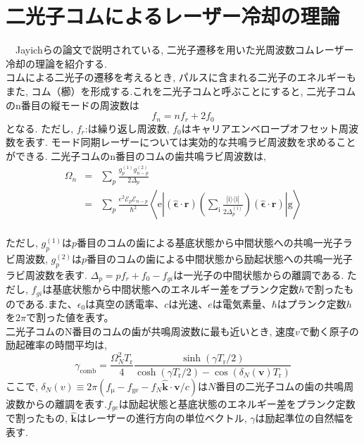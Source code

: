 \documentclass[uplatex, dvipdfmx, a4paper, report, papersize, 11pt]{jsbook}
\begin{document}
\section{二光子コムによるレーザー冷却の理論}
　Jayichらの論文\cite{PhysRevX.6.041004}で説明されている, 二光子遷移を用いた光周波数コムレーザー冷却の理論を紹介する.\\
コムによる二光子の遷移を考えるとき, パルスに含まれる二光子のエネルギーもまた, コム（櫛）を形成する.これを二光子コムと呼ぶことにすると, 二光子コムのn番目の縦モードの周波数は
\begin{equation}
f_n = nf_r + 2f_0
\end{equation}
となる. ただし, $f_r$:は繰り返し周波数, $f_0$はキャリアエンベロープオフセット周波数を表す. モード同期レーザーについては実効的な共鳴ラビ周波数を求めることができる. 二光子コムのn番目のコムの歯共鳴ラビ周波数は,
\begin{eqnarray}\label{ResonanceRabi}
\Omega _{n} &=&\sum _{p}\frac {g^{\left( 1\right) }_{p}g^{\left( 2\right) }_{n-p}}{2\Delta_p} \nonumber\\
&=& \sum _ { p } \frac { e ^ { 2 } \mathcal { E } _ { p } \mathcal { E } _ { n - p } } { \hbar ^ { 2 } } \left\langle \mathrm { e } \left| ( \hat { \boldsymbol { \epsilon } } \cdot \mathbf { r } ) \left( \sum _ { \mathrm { i } } \frac { | \mathrm { i } \rangle \langle \mathrm { i } | } { 2 \Delta _ { p } ^ { ( \mathrm { i } ) } } \right) ( \hat { \boldsymbol { \epsilon } } \cdot \mathbf { r } ) \right| \mathrm { g } \right\rangle
\end{eqnarray}\\
ただし, $g^{\left( 1\right) }_{p}$は$p$番目のコムの歯による基底状態から中間状態への共鳴一光子ラビ周波数, $g^{\left( 2\right) }_{p}$は$p$番目のコムの歯による中間状態から励起状態への共鳴一光子ラビ周波数を表す.
$\Delta _{p}=pf_{r}+f_{0}-f_{gi}$は一光子の中間状態からの離調である. ただし, $f_{gi}$は基底状態から中間状態へのエネルギー差をプランク定数$h$で割ったものである.また、$\epsilon_0$は真空の誘電率、$c$は光速、$e$は電気素量、$\hbar$はプランク定数$h$を$2\pi$で割った値を表す。\\
二光子コムのN番目のコムの歯が共鳴周波数に最も近いとき, 速度$v$で動く原子の励起確率の時間平均は,
\begin{equation}\label{ExcitationRate}
\gamma_\mathrm{comb} = \frac{\Omega^2_{N}T_\mathrm{r}} {4} \frac{\sinh(\gamma T_\mathrm{r}/2)}{\cosh(\gamma T_\mathrm{r}/2) - \cos(\delta_N(\bm{v})T_\mathrm{r})}
\end{equation}
ここで, $\delta _{N}\left( v\right) \equiv 2\pi ( f_\mathrm{\mu }-f_\mathrm{ge}-f_{N}\widehat {\bm{k}}\cdot {\bm{v}}/c )$は$N$番目の二光子コムの歯の共鳴周波数からの離調を表す.$f_{ge}$は励起状態と基底状態のエネルギー差をプランク定数で割ったもの, $\widehat {\bm{k}}$はレーザーの進行方向の単位ベクトル, $\gamma$は励起準位の自然幅を表す.\\
\end{document}
